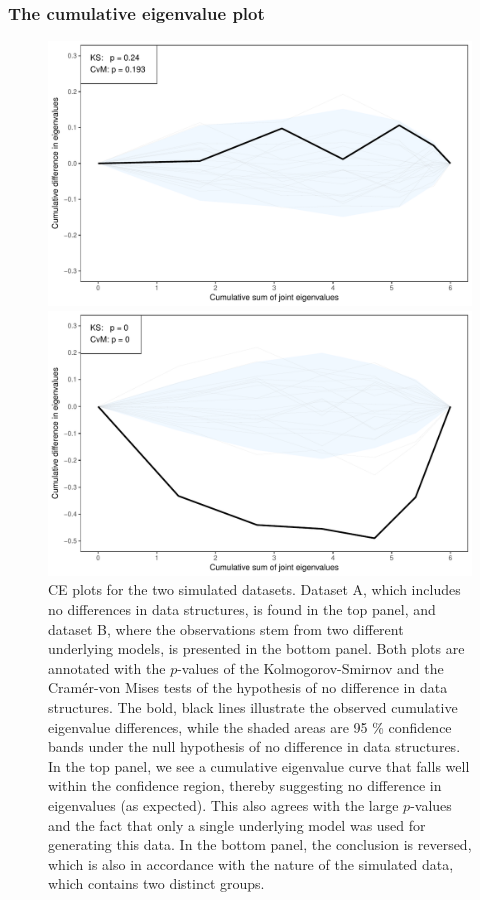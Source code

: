 \documentclass[titlepage,11pt,twoside]{article}
\begin{document}
\subsubsection{The cumulative eigenvalue plot}
\begin{figure}
\centerline{\includegraphics[scale = 0.65]{simCE2.pdf}}
\centerline{\includegraphics[scale = 0.65]{simCE1.pdf}}
\caption{CE plots for the two simulated datasets. Dataset A, which includes no differences in data structures, is found in the top panel, and dataset B, where the observations stem from two different underlying models, is presented in the bottom panel. Both plots are annotated with the $p$-values of the Kolmogorov-Smirnov and the Cram\'er-von Mises tests of the hypothesis of no difference in data structures. The bold, black lines illustrate the observed cumulative eigenvalue differences, while the shaded areas are 95 \% confidence bands under the null hypothesis of no difference in data structures. In the top panel, we see a cumulative eigenvalue curve that falls well within the confidence region, thereby suggesting no difference in eigenvalues (as expected). This also agrees with the large $p$-values and the fact that only a single underlying model was used for generating this data. In the bottom panel, the conclusion is reversed, which is also in accordance with the nature of the simulated data, which contains two distinct groups.}
\label{plot.simCE}
\end{figure}
\end{document}
